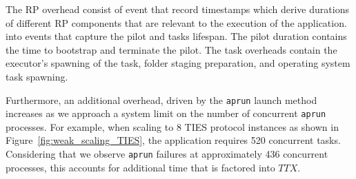 The RP overhead consist of event that record timestamps which derive
durations of different RP components that are relevant to the execution of
the application.  into events  that
capture the pilot and tasks lifespan. The pilot duration contains the time to
bootstrap and terminate the pilot. The task overheads contain the executor's
spawning of the task, folder staging preparation, and operating system task
spawning.  


Furthermore, an additional overhead, driven by the \texttt{aprun}
launch method increases as we approach a system limit on the number of
concurrent  \texttt{aprun} processes.
For example, when scaling to 8 TIES protocol instances as shown in
Figure~\ref{fig:weak_scaling_TIES}, the application requires 520 concurrent
tasks. Considering that we observe \texttt{aprun} failures at approximately
436 concurrent processes, this accounts for additional time that is factored
into \(TTX\). 



